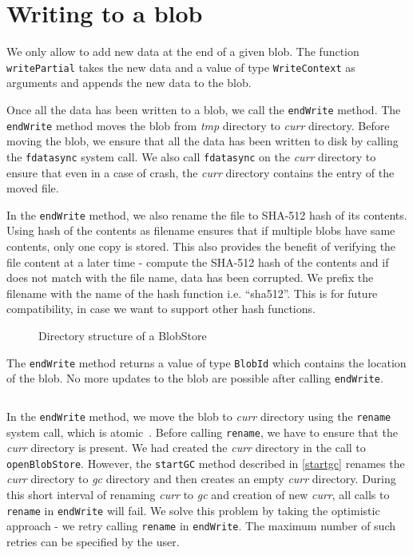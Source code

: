 \section{Writing to a blob}
We only allow to add new data at the end of a given blob. The function \texttt{writePartial} takes the new data and a value of type \texttt{WriteContext} as arguments and appends the new data to the blob.

Once all the data has been written to a blob, we call the \texttt{endWrite} method. The \texttt{endWrite} method moves the blob from \textit{tmp} directory to \textit{curr} directory. Before moving the blob, we ensure that all the data has been written to disk by calling the \texttt{fdatasync} system call.
We also call \texttt{fdatasync} on the \textit{curr} directory to ensure that even in a case of crash, the \textit{curr} directory contains the entry of the moved file.

In the \texttt{endWrite} method, we also rename the file to SHA-512 hash of its contents. Using hash of the contents as filename ensures that if multiple blobs have same contents, only one copy is stored. This also provides the benefit of verifying the file content at a later time - compute the SHA-512 hash of the contents and if does not match with the file name, data has been corrupted.
We prefix the filename with the name of the hash function i.e. ``sha512''. This is for future compatibility, in case we want to support other hash functions.

\begin{figure}[hbt]
  \caption{Directory structure of a BlobStore}
  \label{fig:blobstore-dirstructure}
\end{figure}

The \texttt{endWrite} method returns a value of type \texttt{BlobId} which contains the location of the blob. No more updates to the blob are possible after calling \texttt{endWrite}.

\begin{program}
  \caption{Definition of BlobId}
  \label{prog:defblobid}
  \inputminted{haskell}{hs/blobid.hs}
\end{program}

In the \texttt{endWrite} method, we move the blob to \textit{curr} directory using the \texttt{rename} system call, which is atomic~\cite{renamemanpage}. Before calling \texttt{rename}, we have to ensure that the \textit{curr} directory is present. We had created the \textit{curr} directory in the call to \texttt{openBlobStore}.
However, the \texttt{startGC} method described in \ref{startgc} renames the \textit{curr} directory to \textit{gc} directory and then creates an empty \textit{curr} directory. During this short interval of renaming \textit{curr} to \textit{gc} and creation of new \textit{curr}, all calls to \texttt{rename} in \texttt{endWrite} will fail.
We solve this problem by taking the optimistic approach - we retry calling \texttt{rename} in \texttt{endWrite}. The maximum number of such retries can be specified by the user.


